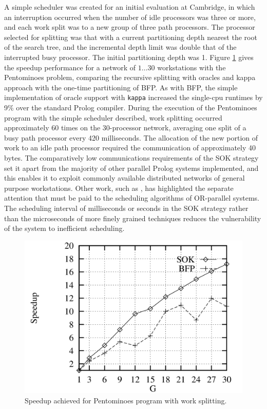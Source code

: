 \documentclass[a4paper,11pt,twoside]{article}
\begin{document}
A simple scheduler was created for an initial evaluation at Cambridge,
in which an interruption occurred when
the number of idle processors was three or more, and each work split
was to a new group of three path processors.  The processor selected for splitting
was that with a current partitioning depth nearest the root of the search tree, and 
the incremental depth limit was double that of the interrupted busy processor. The
initial partitioning depth was 1.  Figure \ref{pent_sok} gives the speedup performance
for a network of $1\ldots 30$ workstations with the Pentominoes problem, comparing the
recursive splitting with oracles and kappa approach with the one-time partitioning
of BFP.  As with BFP, the simple implementation of oracle support with \texttt{kappa}
increased the single-cpu runtimes by 9\% over the standard Prolog compiler.  During
the execution of the Pentominoes program with the simple scheduler described, work
splitting occurred approximately 60 times on the 30-processor network, averaging one
split of a busy path processor
every 420 milliseconds.  The allocation of the new portion of work to an
idle path processor required the communication of approximately 40 bytes.  The
comparatively low communications requirements of the SOK strategy set it apart from
the majority of other parallel Prolog systems implemented, and this enables it to
exploit commonly available distributed networks of general purpose workstations.
Other work, such as \cite{Bea91, BDLO+88}, has highlighted the separate attention that
must be paid to the scheduling algorithms of OR-parallel systems.  The scheduling
interval of milliseconds or seconds in the SOK strategy rather than the microseconds
of more finely grained techniques reduces the vulnerability of the system to inefficient
scheduling.

\begin{figure}
  \includegraphics[width=\linewidth]{pent_sok.png}
  \caption{Speedup achieved for Pentominoes program with work splitting.}
  \label{pent_sok}
\end{figure}
\end{document}
